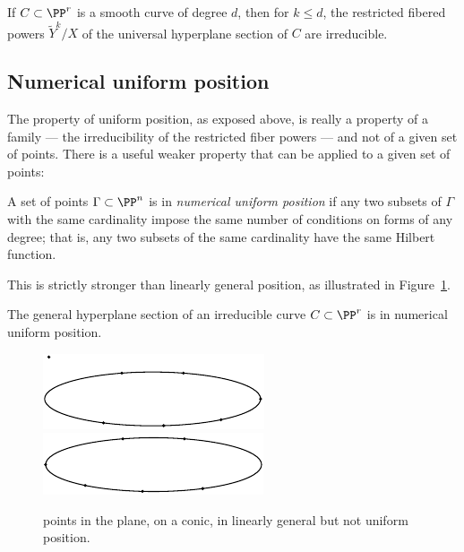 \begin{corollary}\label{hyperplane section monodromy} If $C\subset \PP^r$ is a smooth curve of degree $d$, then 
for $k\leq d$, the restricted fibered powers $\tilde Y^k/X$  of the universal hyperplane section 
of $C$ are irreducible.
\end{corollary}

\subsection{Numerical uniform position}

The property of uniform position, as exposed above, is really a property of a family --- the irreducibility of the restricted
fiber powers --- and not of a given set of points. There is a useful weaker property that 
can be applied to a given set of points:

\begin{definition}
 A set of points $\Gamma\subset \PP^n$ is in \emph{numerical uniform position} if 
 any two subsets of $\Gamma$ with the same cardinality impose the same number of conditions on forms of any degree; that is, any two subsets of the same cardinality have the same Hilbert function.
\end{definition}

This is strictly stronger than linearly general position, as illustrated in Figure~\ref{numerical uniform is stronger}.

\begin{corollary}\label{numerical uniform position lemma}
The general hyperplane section of an irreducible curve
$C\subset \PP^r$ is in numerical uniform position. 
\end{corollary}


\begin{figure}
\leavevmode
\vbox{\offinterlineskip
\hbox{\includegraphics[scale=1.3,viewport=-10 37 118 39,clip]{"main/Fig10-2"}}%
\hbox{\includegraphics[scale=1.3,viewport=0 0 118 33,clip]{"main/Fig10-2a"}}}
\caption{
points in the plane, 
on a conic, in linearly general but not uniform position.}
\label{numerical uniform is stronger}
\end{figure}


